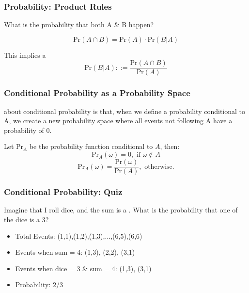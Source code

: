 \documentclass{beamer}
\begin{document}
\begin{frame}
  \frametitle{Probability: Product Rules}

  {\large
    What is the probability that \alert{both} A \& B happen?

    \begin{equation}
      \text{Pr}(A\cap B) = \text{Pr}(A) \cdot \text{Pr}(B|A)
    \end{equation}
    \bigskip
    
    This implies a 
    \begin{equation}
      \text{Pr}(B|A) ::= \frac{\text{Pr}(A\cap B)}{\text{Pr}(A)}
    \end{equation}

  }
\end{frame}

\begin{frame}
  \frametitle{Conditional Probability as a Probability Space}

  {\large
     about conditional probability is
    that, when we define a probability conditional to A, we
    \alert{create a new probability space} where all events not following
    A have a probability of 0.

    \vfill

    Let Pr$_A$ be the probability function conditional to $A$, then:
    \begin{equation*}
      \text{Pr}_A(\omega) = 0, \text{ if } \omega \notin A
    \end{equation*}
    \begin{equation*}
      \text{Pr}_A(\omega) = \frac{\text{Pr}(\omega)}{\text{Pr}(A)},
      \text{ otherwise.}
    \end{equation*}

  }
\end{frame}

\begin{frame}
  \frametitle{Conditional Probability: Quiz}

  {\large
    Imagine that I roll  dice, and the sum is a .
    What is the probability that \alert{one of the dice is a 3}?

    \vfill
    
    \begin{itemize}
    \item<2-> Total Events: (1,1),(1,2),(1,3),$\ldots$,(6,5),(6,6)
    \item<3-> Events when sum = 4: (1,3), (2,2), (3,1)
    \item<4-> Events when dice = 3 \& sum = 4: (1,3), (3,1)
      \bigskip

    \item<5-> Probability: 2/3
    \end{itemize}
    
  }
\end{frame}
\end{document}
